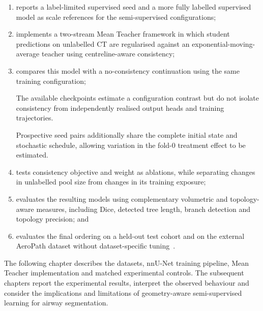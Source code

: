 \begin{enumerate}
    \item reports a label-limited supervised seed and a more fully labelled supervised model as
    scale references for the semi-supervised configurations;

    \item implements a two-stream Mean Teacher framework in which student predictions on
    unlabelled CT are regularised against an exponential-moving-average teacher using
    centreline-aware consistency;

    \item compares this model with a no-consistency continuation using the same training
    configuration;

    \ifshowcurrentcontrol
    \begin{currentcontrolroute}
    The available checkpoints estimate a configuration contrast but do not isolate consistency
    from independently realised output heads and training trajectories.
    \end{currentcontrolroute}
    \fi

    \ifshowpairedcontrol
    \begin{pairedcontrolroute}
    Prospective seed pairs additionally share the complete initial state and stochastic schedule,
    allowing variation in the fold-0 treatment effect to be estimated.
    \end{pairedcontrolroute}
    \fi

    \item tests consistency objective and weight as ablations, while
    separating changes in unlabelled pool size from changes in its training exposure;

    \item evaluates the resulting models using complementary volumetric and topology-aware
    measures, including Dice, detected tree length, branch detection and topology
    precision; and

    \item evaluates the final ordering on a held-out test cohort and on the external AeroPath
    dataset without dataset-specific tuning~\cite{stoverud2023aeropath}.
\end{enumerate}

The following chapter describes the datasets, nnU-Net training pipeline, Mean Teacher
implementation and matched experimental controls. The subsequent chapters report the
experimental results, interpret the observed behaviour and consider the implications and
limitations of geometry-aware semi-supervised learning for airway segmentation.
